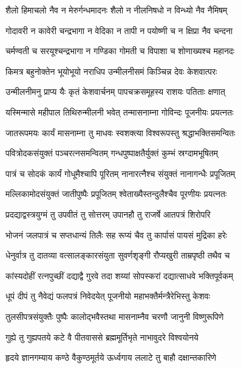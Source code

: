 \twolineshloka
{शैलो हिमाचलो नैव न मेरुर्गन्धमादनः}
{शैलो न नीलनिषधो न विन्ध्यो नैव नैमिषम्}%

\twolineshloka
{गोदावरी न कावेरी चन्द्रभागा न वेदिका}
{न तापी न पयोष्णी च न क्षिप्रा नैव चन्दना}%

\twolineshloka
{चर्मण्वती च सरयूश्चन्द्रभागा न गण्डिका}
{गोमती च विपाशा च शोणाख्यश्च महानदः}%

\twolineshloka
{किमत्र बहुनोक्तेन भूयोभूयो नराधिप}
{उन्मीलनीसमं किञ्चिन्न देवः केशवात्परः}%

\twolineshloka
{उन्मीलनीमनु प्राप्य यैः कृतं केशवार्चनम्}
{पापचक्रसमूहस्य राशयः पतिताः क्षणात्}%

\twolineshloka
{यस्मिन्मासे महीपाल तिथिरुन्मीलनी भवेत्}
{तन्मासनाम्ना गोविन्दः पूजनीयः प्रयत्नतः}%

\twolineshloka
{जातरूपमयः कार्यं मासनाम्ना तु माधवः}
{स्वशक्त्या विश्वरूपस्तु श्रद्धाभक्तिसमन्वितः}%

\twolineshloka
{पवित्रोदकसंयुक्तं पञ्चरत्नसमन्वितम्}
{गन्धपुष्पाक्षतैर्युक्तं कुम्भं स्रग्दामभूषितम्}%

\twolineshloka
{पात्रं च सोदकं कार्यं गोधूमैश्चापि पूरितम्}
{नानारत्नैश्च संयुक्तं नानागन्धैः प्रपूजितम्}%

\twolineshloka
{मल्लिकामोदसंयुक्तं जातीपुष्पैः प्रपूजितम्}
{श्वेताख्यैस्तन्दुलैश्चैव पूरणीयः प्रयत्नतः}%

\twolineshloka
{प्रदद्याद्वस्त्रयुग्मं तु उपवीतं तु सोत्तरम्}
{उपानहौ तु राजर्षे आतपत्रं शिरोपरि}%

\twolineshloka
{भोजनं जलपात्रं च सप्तधान्यं तिलैः सह}
{रूप्यं चैव तु कार्पासं पायसं मुद्रिका हरेः}%

\twolineshloka
{धेनुर्वात्र तु दातव्या वत्सालङ्कारसंयुता}
{सुवर्णशृङ्गी रौप्यखुरी ताम्रपृष्ठी तथैव च}%

\twolineshloka
{कांस्यदोहीं रत्नपुच्छीं दद्याद्वै गुरवे तदा}
{शय्यां सोपस्करां दद्यात्साधवे भक्तिपूर्वकम्}%

\twolineshloka
{धूपं दीपं तु नैवेद्यं फलपत्रं निवेदयेत्}
{पूजनीयो महाभक्तैर्मन्त्रैरेभिस्तु केशवः}%

\twolineshloka
{तुलसीपत्रसंयुक्तैः पुष्पैः कालोद्भवैस्तथा}
{मासनाम्नैव चरणौ जानुनी विष्णुरूपिणे}%

\twolineshloka
{गुह्ये तु गुह्यपतये कटे वै पीतवाससे}
{ब्रह्ममूर्तिभृते नाभावुदरे विश्वयोनये}%

\twolineshloka
{हृदये ज्ञानगम्याय कण्ठे वैकुण्ठमूर्तये}
{ऊर्ध्वगाय ललाटे तु बाहौ दक्षान्तकारिणे}%

